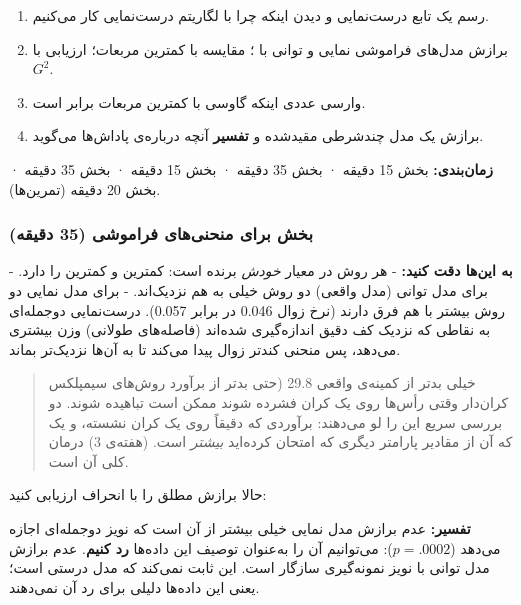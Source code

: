 \begin{enumerate}
\def\labelenumi{\arabic{enumi}.}
\tightlist
\item
  رسم یک تابع درست‌نمایی و دیدن اینکه چرا با لگاریتم درست‌نمایی کار
  می‌کنیم.
\item
  برازش مدل‌های فراموشی نمایی و توانی با ؛ مقایسه با کمترین
  مربعات؛ ارزیابی با \(G^2\).
\item
  وارسی عددی اینکه  گاوسی با کمترین مربعات برابر است.
\item
  برازش یک مدل  چندشرطی مقیدشده و \textbf{تفسیر} آنچه درباره‌ی
  پاداش‌ها می‌گوید.
\end{enumerate}

\textbf{زمان‌بندی:} بخش  15 دقیقه · بخش  35 دقیقه · بخش
 15 دقیقه · بخش  35 دقیقه · بخش  20 دقیقه (تمرین‌ها).

\subsubsection{\texorpdfstring{بخش  برای منحنی‌های فراموشی (35
دقیقه)}{بخش B: MLE برای منحنی‌های فراموشی (35 دقیقه)}}

\textbf{به این‌ها دقت کنید:} - هر روش در معیار \emph{خودش} برنده است:
 کمترین  و  کمترین  را دارد. - برای مدل
توانی (مدل واقعی) دو روش خیلی به هم نزدیک‌اند. - برای مدل نمایی دو روش
بیشتر با هم فرق دارند (نرخ زوال 0.046 در برابر 0.057). درست‌نمایی
دوجمله‌ای به نقاطی که نزدیک کف دقیق اندازه‌گیری شده‌اند (فاصله‌های طولانی)
وزن بیشتری می‌دهد، پس منحنی  کندتر زوال پیدا می‌کند تا به آن‌ها
نزدیک‌تر بماند.

\begin{quote}
خیلی بدتر از کمینه‌ی واقعی 29.8 (حتی بدتر از  برآورد 
روش‌های سیمپلکس کران‌دار وقتی رأس‌ها روی یک کران فشرده شوند ممکن است
تباهیده  شوند. دو بررسی سریع این را لو می‌دهند: برآوردی
که دقیقاً روی یک کران نشسته، و یک  که  آن از مقادیر
پارامتر دیگری که امتحان کرده‌اید \emph{بیشتر} است. 
(هفته‌ی 3) درمان کلی آن است.
\end{quote}

حالا برازش مطلق را با انحراف ارزیابی کنید:

\textbf{تفسیر:} عدم برازش مدل نمایی خیلی بیشتر از آن است که نویز
دوجمله‌ای اجازه می‌دهد (\(p = .0002\)): می‌توانیم آن را به‌عنوان توصیف این
داده‌ها \textbf{رد کنیم}. عدم برازش مدل توانی با نویز نمونه‌گیری سازگار
است. این ثابت نمی‌کند که مدل درستی است؛ یعنی این داده‌ها دلیلی برای رد آن
نمی‌دهند.

